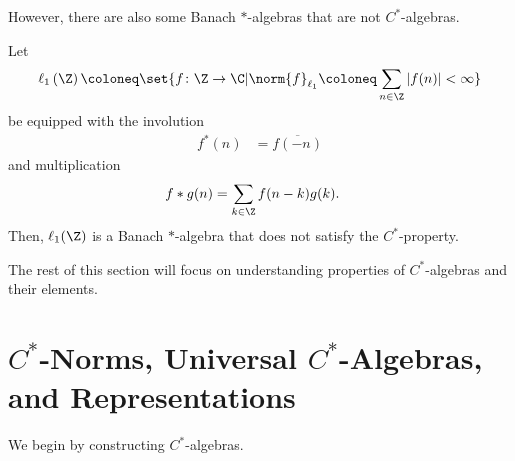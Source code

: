 However, there are also some Banach $\ast$-algebras that are not $C^{\ast}$-algebras.
\begin{example}
  Let 
  \begin{align*}
    \ell_1\left( \Z \right)\coloneq \set{f\colon \Z\rightarrow\C | \norm{f}_{\ell_1} \coloneq \sum_{n\in\Z}\left\vert f(n) \right\vert < \infty}
  \end{align*}
  be equipped with the involution
  \begin{align*}
    f^{\ast}\left( n \right) &= \overline{f\left( -n \right)}
  \end{align*}
  and multiplication
  \begin{align*}
    f\ast g(n) &= \sum_{k\in\Z}f(n-k)g(k).
  \end{align*}
  Then, $\ell_1(\Z)$ is a Banach $\ast$-algebra that does not satisfy the $C^{\ast}$-property.
\end{example}
The rest of this section will focus on understanding properties of $C^{\ast}$-algebras and their elements.
\section{\texorpdfstring{$C^{\ast}$-Norms}{C*-Norms}, Universal \texorpdfstring{$C^{\ast}$-Algebras}{C*-Algebras}, and Representations}%
We begin by constructing $C^{\ast}$-algebras.\newline

